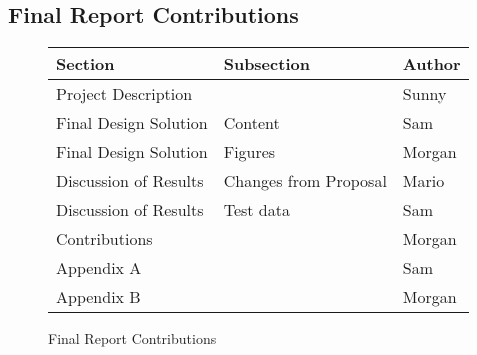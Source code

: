 \subsection{Final Report Contributions}

\begin{figure}[!htb]
\centering
\begin{tabular}{lll}
Section               & Subsection            & Author\\
\hline
Project Description   &                       & Sunny\\
Final Design Solution & Content               & Sam\\
Final Design Solution & Figures               & Morgan\\
Discussion of Results & Changes from Proposal & Mario\\
Discussion of Results & Test data             & Sam\\
Contributions         &                       & Morgan\\
Appendix A            &                       & Sam\\
Appendix B            &                       & Morgan\\
\end{tabular}
\caption{Final Report Contributions}
\label{fig:final-report-contributions}
\end{figure}
